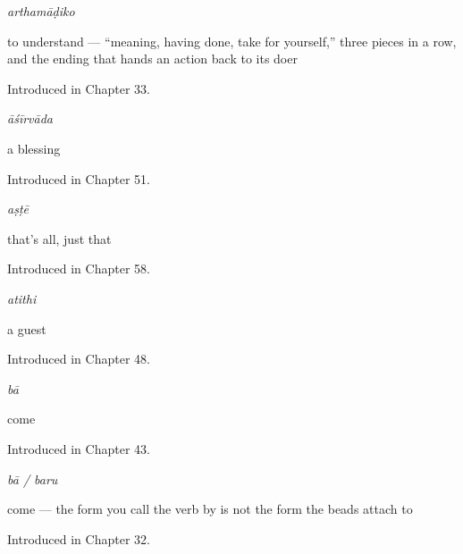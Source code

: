 \noindent\begin{minipage}[t]{\linewidth}
\raggedright
\textbf{}\enspace\emph{arthamāḍiko}\par
\small to understand — \textquotedblleft{}meaning, having done, take for yourself,\textquotedblright{} three pieces in a row, and the ending that hands an action back to its doer\par
\footnotesize Introduced in Chapter 33.
\end{minipage}\par\medskip

\noindent\begin{minipage}[t]{\linewidth}
\raggedright
\textbf{}\enspace\emph{āśīrvāda}\par
\small a blessing\par
\footnotesize Introduced in Chapter 51.
\end{minipage}\par\medskip

\noindent\begin{minipage}[t]{\linewidth}
\raggedright
\textbf{}\enspace\emph{aṣṭē}\par
\small that's all, just that\par
\footnotesize Introduced in Chapter 58.
\end{minipage}\par\medskip

\noindent\begin{minipage}[t]{\linewidth}
\raggedright
\textbf{}\enspace\emph{atithi}\par
\small a guest\par
\footnotesize Introduced in Chapter 48.
\end{minipage}\par\medskip

\noindent\begin{minipage}[t]{\linewidth}
\raggedright
\textbf{}\enspace\emph{bā}\par
\small come\par
\footnotesize Introduced in Chapter 43.
\end{minipage}\par\medskip

\noindent\begin{minipage}[t]{\linewidth}
\raggedright
\textbf{}\enspace\emph{bā / baru}\par
\small come — the form you call the verb by is not the form the beads attach to\par
\footnotesize Introduced in Chapter 32.
\end{minipage}\par\medskip

